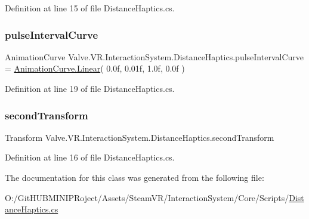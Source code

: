 Definition at line 15 of file Distance\+Haptics.\+cs.

\mbox{\label{class_valve_1_1_v_r_1_1_interaction_system_1_1_distance_haptics_a2cd5bb043a441926bd9a4796568ebf9c}} 
\subsubsection{\texorpdfstring{pulseIntervalCurve}{pulseIntervalCurve}}
{\footnotesize\ttfamily Animation\+Curve Valve.\+V\+R.\+Interaction\+System.\+Distance\+Haptics.\+pulse\+Interval\+Curve = \mbox{\hyperlink{namespace_valve_1_1_v_r_aeb0fba37ba28d8ca276d7c10f01809aca32a843da6ea40ab3b17a3421ccdf671b}{Animation\+Curve.\+Linear}}( 0.\+0f, 0.\+01f, 1.\+0f, 0.\+0f )}



Definition at line 19 of file Distance\+Haptics.\+cs.

\mbox{\label{class_valve_1_1_v_r_1_1_interaction_system_1_1_distance_haptics_a34fbf0b5ae8c9f9d88bb38b4348a5189}} 
\subsubsection{\texorpdfstring{secondTransform}{secondTransform}}
{\footnotesize\ttfamily Transform Valve.\+V\+R.\+Interaction\+System.\+Distance\+Haptics.\+second\+Transform}



Definition at line 16 of file Distance\+Haptics.\+cs.



The documentation for this class was generated from the following file\+:\begin{DoxyCompactItemize}
\item 
O\+:/\+Git\+H\+U\+B\+M\+I\+N\+I\+P\+Roject/\+Assets/\+Steam\+V\+R/\+Interaction\+System/\+Core/\+Scripts/\mbox{\hyperlink{_distance_haptics_8cs}{Distance\+Haptics.\+cs}}\end{DoxyCompactItemize}
